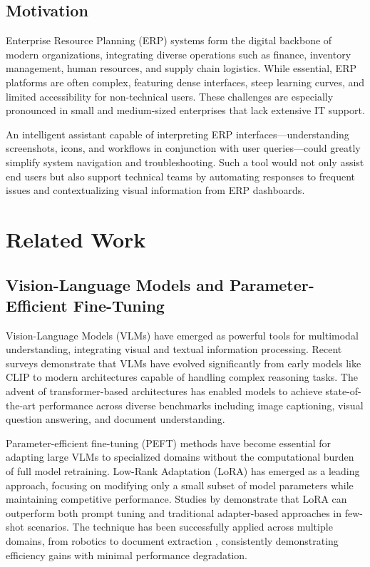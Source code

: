 \documentclass[10pt,conference,compsocconf]{IEEEtran}
\begin{document}
\subsection{Motivation}

Enterprise Resource Planning (ERP) systems form the digital backbone of modern organizations, integrating diverse operations such as finance, inventory management, human resources, and supply chain logistics. While essential, ERP platforms are often complex, featuring dense interfaces, steep learning curves, and limited accessibility for non-technical users. These challenges are especially pronounced in small and medium-sized enterprises that lack extensive IT support.  

An intelligent assistant capable of interpreting ERP interfaces—understanding screenshots, icons, and workflows in conjunction with user queries—could greatly simplify system navigation and troubleshooting. Such a tool would not only assist end users but also support technical teams by automating responses to frequent issues and contextualizing visual information from ERP dashboards.

\section{Related Work}

\subsection{Vision-Language Models and Parameter-Efficient Fine-Tuning}

Vision-Language Models (VLMs) have emerged as powerful tools for multimodal understanding, integrating visual and textual information processing. Recent surveys \cite{danish2025comprehensive} \cite{sun2024survey} demonstrate that VLMs have evolved significantly from early models like CLIP to modern architectures capable of handling complex reasoning tasks. The advent of transformer-based architectures has enabled models to achieve state-of-the-art performance across diverse benchmarks including image captioning, visual question answering, and document understanding.

Parameter-efficient fine-tuning (PEFT) methods have become essential for adapting large VLMs to specialized domains without the computational burden of full model retraining. Low-Rank Adaptation (LoRA) \cite{hu2021loralowrankadaptationlarge} has emerged as a leading approach, focusing on modifying only a small subset of model parameters while maintaining competitive performance. Studies by \cite{zanella2024cliplora} demonstrate that LoRA can outperform both prompt tuning and traditional adapter-based approaches in few-shot scenarios. The technique has been successfully applied across multiple domains, from robotics \cite{vilone2024finetuning} to document extraction \cite{nanonets2025vlmfinetuning}, consistently demonstrating efficiency gains with minimal performance degradation.
\end{document}
